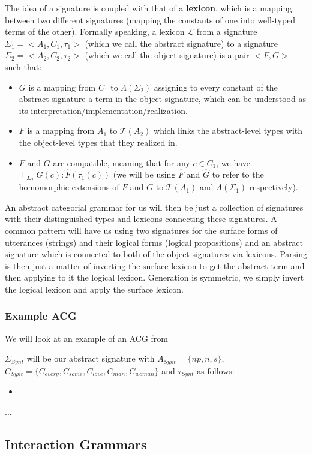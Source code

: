 \documentclass{article}
\begin{document}
The idea of a signature is coupled with that of a \textbf{lexicon},
which is a mapping between two different signatures (mapping the
constants of one into well-typed terms of the other). Formally speaking,
a lexicon $\mathcal{L}$ from a signature $\Sigma_1 = \mathopen{<}A_1, C_1,
\tau_1\mathclose{>}$ (which we call the abstract signature) to a
signature $\Sigma_2 = \mathopen{<}A_2, C_2, \tau_2\mathclose{>}$ (which
we call the object signature) is a pair $\mathopen{<}F, G\mathclose{>}$
such that:
\begin{itemize}
\item $G$ is a mapping from $C_1$ to $\Lambda(\Sigma_2)$ assigning to
  every constant of the abstract signature a term in the object
  signature, which can be understood as its
  interpretation/implementation/realization.
\item $F$ is a mapping from $A_1$ to $\mathcal{T}(A_2)$ which links the
  abstract-level types with the object-level types that they realized
  in.
\item $F$ and $G$ are compatible, meaning that for any $c \in C_1$, we
  have $\vdash_{\Sigma_2} G(c) : \hat{F}(\tau_1(c))$ (we will be using
  $\hat{F}$ and $\hat{G}$ to refer to the homomorphic extensions of $F$
  and $G$ to $\mathcal{T}(A_1)$ and $\Lambda(\Sigma_1)$ respectively).
\end{itemize}

An abstract categorial grammar for us will then be just a collection of
signatures with their distinguished types and lexicons connecting these
signatures. A common pattern will have us using two signatures for the
surface forms of utterances (strings) and their logical forms (logical
propositions) and an abstract signature which is connected to both of
the object signatures via lexicons. Parsing is then just a matter of
inverting the surface lexicon to get the abstract term and then applying
to it the logical lexicon. Generation is symmetric, we simply invert the
logical lexicon and apply the surface lexicon.

\subsubsection{Example ACG}

We will look at an example of an ACG from


$\Sigma_{Synt}$ will be our abstract signature with $A_{Synt} = \{np, n,
s\}$, $C_{Synt} = \{C_{every}, C_{some}, C_{love}, C_{man}, C_{woman}\}$
and $\tau_{Synt}$ as follows:
\begin{itemize}
\item
\end{itemize}

...

\subsection{Interaction Grammars}



\end{document}
